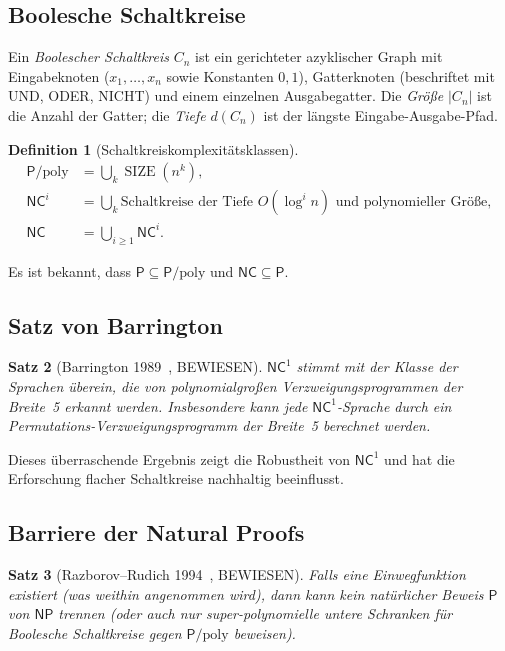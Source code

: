 \documentclass[12pt,a4paper]{amsart}
\newtheorem{theorem}{Satz}[section]
\theoremstyle{definition}
\newtheorem{definition}[theorem]{Definition}
\newcommand{\Pclass}{\mathsf{P}}
\newcommand{\NP}{\mathsf{NP}}
\newcommand{\NC}{\mathsf{NC}}
\DeclareMathOperator{\SIZE}{SIZE}
\begin{document}
\subsection{Boolesche Schaltkreise}

Ein \emph{Boolescher Schaltkreis} $C_n$ ist ein gerichteter azyklischer Graph
mit Eingabeknoten ($x_1,\ldots,x_n$ sowie Konstanten $0,1$), Gatterknoten
(beschriftet mit UND, ODER, NICHT) und einem einzelnen Ausgabegatter.
Die \emph{Größe} $|C_n|$ ist die Anzahl der Gatter; die \emph{Tiefe}
$d(C_n)$ ist der längste Eingabe-Ausgabe-Pfad.

\begin{definition}[Schaltkreiskomplexitätsklassen]
\begin{align*}
  \Pclass/\mathrm{poly} &= \bigcup_{k}\SIZE(n^k), \\
  \NC^i &= \bigcup_{k}\text{Schaltkreise der Tiefe }O(\log^i n)\text{ und polynomieller Größe},\\
  \NC &= \bigcup_{i\geq 1}\NC^i.
\end{align*}
\end{definition}

Es ist bekannt, dass $\Pclass\subseteq\Pclass/\mathrm{poly}$ und $\NC\subseteq\Pclass$.

\subsection{Satz von Barrington}

\begin{theorem}[Barrington 1989~\cite{barrington1989}, BEWIESEN]
$\NC^1$ stimmt mit der Klasse der Sprachen überein, die von polynomialgroßen
Verzweigungsprogrammen der Breite~5 erkannt werden.  Insbesondere kann jede
$\NC^1$-Sprache durch ein Permutations-Verzweigungsprogramm der Breite~5
berechnet werden.
\end{theorem}

Dieses überraschende Ergebnis zeigt die Robustheit von $\NC^1$ und hat die
Erforschung flacher Schaltkreise nachhaltig beeinflusst.

\subsection{Barriere der Natural Proofs}

\begin{theorem}[Razborov--Rudich 1994~\cite{razborov1994}, BEWIESEN]
Falls eine Einwegfunktion existiert (was weithin angenommen wird), dann kann
kein \emph{natürlicher Beweis} $\Pclass$ von $\NP$ trennen (oder auch nur
super-polynomielle untere Schranken für Boolesche Schaltkreise gegen
$\Pclass/\mathrm{poly}$ beweisen).
\end{theorem}
\end{document}
